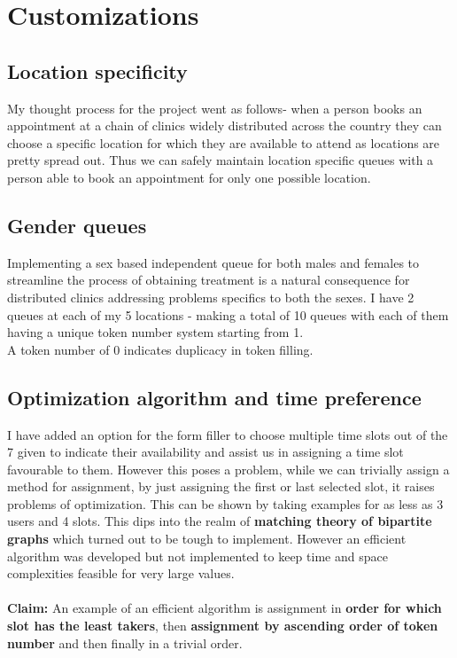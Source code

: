 \documentclass{article}
\begin{document}
\section{Customizations}
\subsection{Location specificity}
My thought process for the project went as follows- when a person books an appointment at a chain of clinics widely distributed across the country they can choose a specific location for which they are available to attend as locations are pretty spread out. Thus we can safely maintain location specific queues with a person able to book an appointment for only one possible location.
\subsection{Gender queues}
Implementing a sex based independent queue for both males and females to streamline the process of obtaining treatment is a natural consequence for distributed clinics addressing problems specifics to both the sexes. I have 2 queues at each of my 5 locations - making a total of 10 queues with each of them having a unique token number system starting from 1.\\
A token number of 0 indicates duplicacy in token filling.
\subsection{Optimization algorithm and time preference}
I have added an option for the form filler to choose multiple time slots out of the 7 given to indicate their availability and assist us in assigning a time slot favourable to them. However this poses a problem, while we can trivially assign a method for assignment, by just assigning the first or last selected slot, it raises problems of optimization. This can be shown by taking examples for as less as 3 users and 4 slots. This dips into the realm of \textbf{matching theory of bipartite graphs}\autocite{3} which turned out to be tough to implement. However an efficient algorithm was developed but not implemented to keep time and space complexities feasible for very large values.\\\\
\textbf{Claim:} An example of an efficient algorithm is assignment in \textbf{order for which slot has the least takers}, then \textbf{assignment by ascending order of token number} and then finally in a trivial order. 
\end{document}
